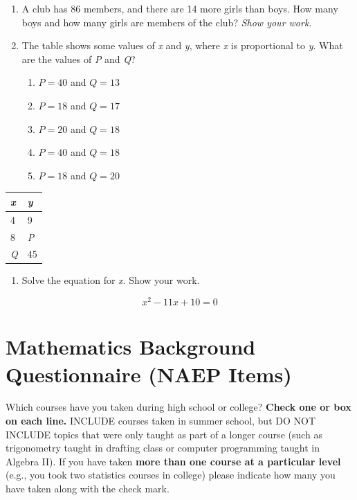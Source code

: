\documentclass[11pt]{umnthesis}
\begin{document}
\begin{enumerate}
\def\labelenumi{\arabic{enumi}.}
\setcounter{enumi}{7}
\item
  A club has 86 members, and there are 14 more girls than boys. How many boys and how many girls are members of the club? \emph{Show your work.}
\item
  The table shows some values of \emph{x} and \emph{y}, where \emph{x} is proportional to \emph{y}. What are the values of \emph{P} and \emph{Q}?

  \begin{enumerate}
  \def\labelenumii{\alph{enumii}.}
  \tightlist
  \item
    \(P=40\) and \(Q=13\)
  \item
    \(P=18\) and \(Q=17\)
  \item
    \(P=20\) and \(Q=18\)
  \item
    \(P=40\) and \(Q=18\)
  \item
    \(P=18\) and \(Q=20\)
  \end{enumerate}
\end{enumerate}

\begin{longtable}[]{@{}ll@{}}
\toprule
\emph{x} & \emph{y} \\
\midrule
\endhead
4 & 9 \\
8 & \emph{P} \\
\emph{Q} & 45 \\
\bottomrule
\end{longtable}

\begin{enumerate}
\def\labelenumi{\arabic{enumi}.}
\setcounter{enumi}{9}
\tightlist
\item
  Solve the equation for \emph{x}. Show your work.
\end{enumerate}

\[
x^2 - 11x + 10 = 0
\]

\hypertarget{mathematics-background-questionnaire-naep-items}{%
\section*{Mathematics Background Questionnaire (NAEP Items)}\label{mathematics-background-questionnaire-naep-items}}

Which courses have you taken during high school or college? \textbf{Check one or box on each line.} INCLUDE courses taken in summer school, but DO NOT INCLUDE topics that were only taught as part of a longer course (such as trigonometry taught in drafting class or computer programming taught in Algebra II). If you have taken \textbf{more than one course at a particular level} (e.g., you took two statistics courses in college) please indicate how many you have taken along with the check mark.
\end{document}
